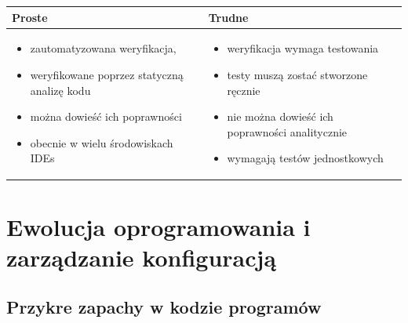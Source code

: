\documentclass[a4paper]{article}
\begin{document}
    \begin{table}[H]
        \begin{center}
            \begin{tabular}{ p{8cm} p{8cm} }
                \textbf{Proste} & \textbf{Trudne}\\
                \toprule
                \begin{itemize}
                    \item zautomatyzowana weryfikacja,
                    \item weryfikowane poprzez statyczną analizę kodu
                    \item można dowieść ich poprawności
                    \item obecnie w wielu środowiskach IDEs
                \end{itemize}
                &
                \begin{itemize}
                    \item weryfikacja wymaga testowania
                    \item testy muszą zostać stworzone ręcznie
                    \item nie można dowieść ich poprawności analitycznie
                    \item wymagają testów jednostkowych
                \end{itemize}
            \end{tabular}
        \end{center}
    \end{table}



    \section{Ewolucja oprogramowania i zarządzanie konfiguracją}


    \subsection{Przykre zapachy w kodzie programów}
\end{document}
